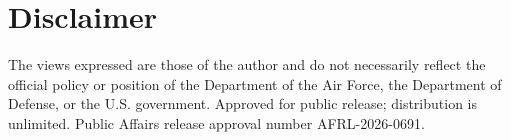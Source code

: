 \documentclass[12pt]{elsarticle}
\begin{document}
\section*{Disclaimer}
The views expressed are those of the author and do not necessarily reflect the official policy or position of the Department of the Air Force, the Department of Defense, or the U.S. government. Approved for public release; distribution is unlimited. Public Affairs release approval number AFRL-2026-0691.
 

\end{document}
